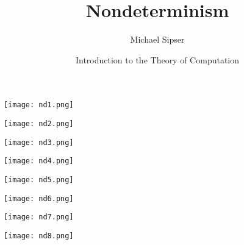 \documentclass[12pt]{report}
\author{Michael Sipser}
\date{Introduction to the Theory of Computation}
\title{Nondeterminism}
\begin{document}
\maketitle
\begin{center}
\texttt{[image: nd1.png]}
\end{center}
\newpage
\begin{center}
\texttt{[image: nd2.png]}
\end{center}
\newpage
\begin{center}
\texttt{[image: nd3.png]}
\end{center}
\newpage
\begin{center}
\texttt{[image: nd4.png]}
\end{center}
\newpage
\begin{center}
\texttt{[image: nd5.png]}
\end{center}
\newpage
\begin{center}
\texttt{[image: nd6.png]}
\end{center}
\newpage
\begin{center}
\texttt{[image: nd7.png]}
\end{center}
\newpage
\begin{center}
\texttt{[image: nd8.png]}
\end{center}
\end{document}
